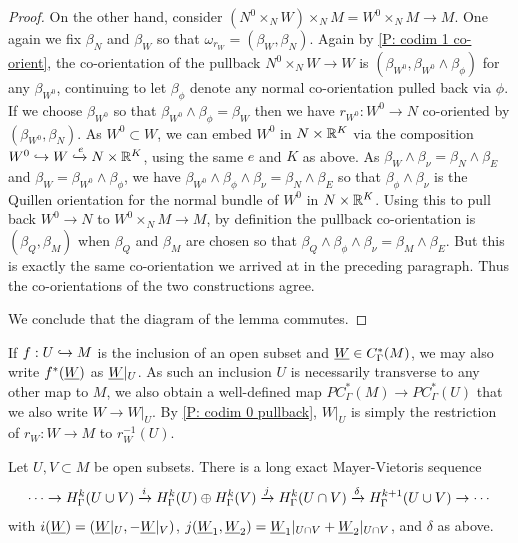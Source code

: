 \begin{proof}
On the other hand, consider $(N^0\times_N W)\times_N M=W^0\times_NM\to M$. One again we fix $\beta_N$ and $\beta_W$ so that $\omega_{r_W}=(\beta_W,\beta_N)$. Again by \cref{P: codim 1 co-orient}, the co-orientation of the pullback $N^0\times_N W\to W$ is $(\beta_{W^0},\beta_{W^0}\wedge \beta_\phi)$ for any $\beta_{W^0}$, continuing to let $\beta_\phi$ denote any normal co-orientation pulled back via $\phi$. If we choose $\beta_{W^0}$ so that $\beta_{W^0}\wedge \beta_\phi=\beta_W$ then we have $r_{W^0}:W^0\to N$ co-oriented by $(\beta_{W^0},\beta_N)$. As $W^0\subset W$, we can embed $W^0$ in $N\times \mathbb{R}^K$ via the composition $W^0\hookrightarrow W \xhookrightarrow{e}N\times \mathbb{R}^K$, using the same $e$ and $K$ as above. As $\beta_W\wedge \beta_\nu=\beta_N\wedge \beta_E$ and $\beta_W=\beta_{W^0}\wedge \beta_\phi$, we have $\beta_{W^0}\wedge \beta_\phi\wedge \beta_\nu=\beta_N\wedge \beta_E$ so that $\beta_\phi\wedge \beta_\nu$ is the Quillen orientation for the normal bundle of $W^0$ in $N\times \mathbb{R}^K$. Using this to pull back $W^0\to N$ to $W^0\times_NM\to M$, by definition the pullback co-orientation is $(\beta_Q,\beta_M)$ when $\beta_Q$ and $\beta_M$ are chosen so that $\beta_Q\wedge \beta_\phi\wedge \beta_\nu=\beta_M\wedge \beta_E$. But this is exactly the same co-orientation we arrived at in the preceding paragraph. Thus the co-orientations of the two constructions agree.


We conclude that the diagram of the lemma commutes.
\end{proof}


\begin{notation}
If $f: U\hookrightarrow M$ is the inclusion of an open subset and $\underline{W}\in C^*_\Gamma(M)$, we may also write $f^*(\underline{W})$ as $\underline{W}|_U$. As such an inclusion $U$ is necessarily transverse to any other map to $M$, we also obtain a well-defined map $PC^*_\Gamma(M)\to PC^*_\Gamma(U)$ that we also write $W\to W|_U$. By \cref{P: codim 0 pullback}, $W|_U$ is simply the restriction of $r_W:W\to M$ to $r_W^{-1}(U)$.
\end{notation}

\begin{theorem}\label{T: absolute MV}
Let $U,V\subset M$ be open subsets. There is a long exact Mayer-Vietoris sequence
$$\cdots\to H^k_\Gamma(U\cup V)\xrightarrow{i} H^k_\Gamma(U)\oplus H^k_\Gamma(V)\xrightarrow{j} H^k_\Gamma(U\cap V)\xrightarrow{\delta} H^{k+1}_\Gamma(U\cup V)\to\cdots$$
with  $i(\underline{W})=(\underline{W}|_U, -\underline{W}|_V)$, $j(\underline{W}_1,\underline{W}_2)=\underline{W}_1|_{U\cap V}+\underline{W}_2|_{U\cap V}$, and $\delta$ as above.
\end{theorem}



